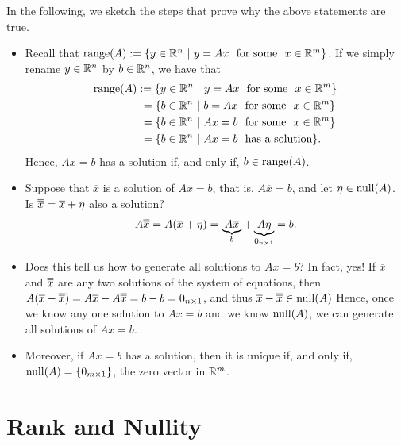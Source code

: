 In the following, we sketch the steps that prove why the above statements are true.
\begin{itemize}
\setlength{\itemsep}{.2cm}
\item Recall that $ \mathrm{range}(A):=\{ y \in \mathbb R^n ~ |~ y = A x~~\text{for some }~x\in \mathbb R^m\}$. If we simply rename $ y \in \mathbb R^n$ by  $b \in \mathbb R^n$, we have that
\begin{align*}
    \mathrm{range}(A)&:=\{ y \in \mathbb R^n ~ |~ y = A x~~\text{for some }~x\in \mathbb R^m\} \\
    &~= \{ b \in \mathbb R^n ~ |~ b = A x~~\text{for some }~x\in \mathbb R^m\}  \\
    &~= \{ b \in \mathbb R^n ~ |~A x=b~~\text{for some }~x\in \mathbb R^m\} \\
    &~= \{ b \in \mathbb R^n ~ |~  A x=b~~\text{has a solution} \}. 
\end{align*}
Hence, $Ax=b$ has a solution if, and only if, $b \in \mathrm{range}(A)$.

\item Suppose that $\overline{x}$ is a solution of $Ax=b$, that is, $A\overline{x}=b$, and let $\eta \in \mathrm{null}(A)$. Is $\doverline{x}=\overline{x} + \eta$ also a solution?
$$ A \doverline{x} = A (\overline{x} + \eta) = \underbrace{A \overline{x}}_{b} +  \underbrace{A\eta}_{0_{n \times 1}} = b.$$

\item Does this tell us how to generate all solutions to $Ax=b$? In fact, yes! If $\overline{x}$ and $\doverline{x}$ are any two solutions of the system of equations, then $A (\overline{x} - \doverline{x}) = A \overline{x} - A\doverline{x} = b - b = 0_{n \times 1}$, and thus $\overline{x} - \doverline{x} \in \nullspace(A)$
Hence, once we know any one solution to $A x = b$ and we know $\mathrm{null}(A)$, we can generate all solutions of $Ax=b$. 

\item Moreover, if $A x = b$ has a solution, then it is unique if, and only if, $\mathrm{null}(A)=\{0_{m \times 1} \}$, the zero vector in $\mathbb R^m$.
\end{itemize}



\section{Rank and Nullity}
\label{sec:RankNullity}

